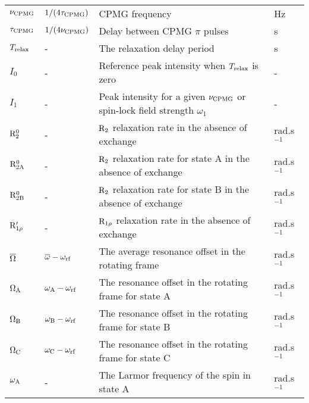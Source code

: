\begin{center}
\begin{small}
\begin{longtable}{llll}
$\nu_{\textrm{CPMG}}$          & $1 / (4 \tau_{\textrm{CPMG}})$             & CPMG frequency                                                                & Hz \\
$\tau_{\textrm{CPMG}}$         & $1 / (4 \nu_{\textrm{CPMG}})$              & Delay between CPMG $\pi$ pulses                                               & s \\
$T_{\textrm{relax}}$          & -                              & The relaxation delay period                                                   & s \\
$I_0$              & -                              & Reference peak intensity when $T_{\textrm{relax}}$ is zero                               & - \\
$I_1$              & -                              & Peak intensity for a given $\nu_{\textrm{CPMG}}$ or spin-lock field strength $\omega_1$   & - \\
$\mathrm{R}_2^0$        & -                              & $\mathrm{R}_2$ relaxation rate in the absence of exchange                            & rad.s$^{-1}$ \\
$\mathrm{R}_{\mathrm{2A}}^0$       & -                              & $\mathrm{R}_2$ relaxation rate for state A in the absence of exchange                & rad.s$^{-1}$ \\
$\mathrm{R}_{\mathrm{2B}}^0$       & -                              & $\mathrm{R}_2$ relaxation rate for state B in the absence of exchange                & rad.s$^{-1}$ \\
$\mathrm{R}_{1\rho}'$    & -                              & $\mathrm{R}_{1\rho}$ relaxation rate in the absence of exchange                         & rad.s$^{-1}$ \\
$\overline{\Omega}$       & $\overline{\omega} - \omega_{\textrm{rf}}$         & The average resonance offset in the rotating frame                            & rad.s$^{-1}$ \\
$\Omega_{\textrm{A}}$         & $\omega_{\textrm{A}} - \omega_{\textrm{rf}}$           & The resonance offset in the rotating frame for state A                        & rad.s$^{-1}$ \\
$\Omega_{\textrm{B}}$         & $\omega_{\textrm{B}} - \omega_{\textrm{rf}}$           & The resonance offset in the rotating frame for state B                        & rad.s$^{-1}$ \\
$\Omega_{\textrm{C}}$         & $\omega_{\textrm{C}} - \omega_{\textrm{rf}}$           & The resonance offset in the rotating frame for state C                        & rad.s$^{-1}$ \\
$\omega_{\textrm{A}}$          & -                              & The Larmor frequency of the spin in state A                                   & rad.s$^{-1}$ \\

\end{longtable}
\end{small}
\end{center}
